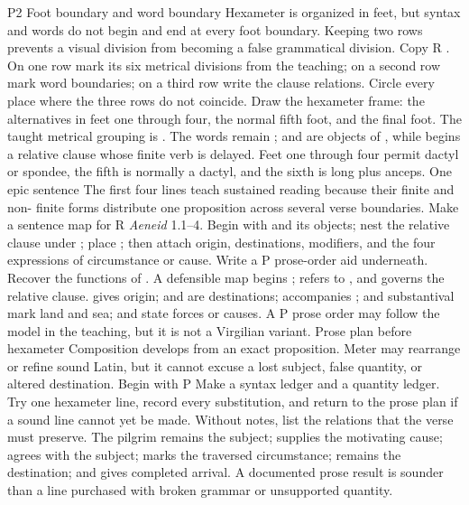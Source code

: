 \begin{courseunit}{P2}
\SubmoduleExtension
  {Foot boundary and word boundary}
  {Hexameter is organized in feet, but syntax and words do not begin and end
  at every foot boundary. Keeping two rows prevents a visual division from
  becoming a false grammatical division.}
  {Copy R . On one row
  mark its six metrical divisions from the teaching; on a second row mark word
  boundaries; on a third row write the clause relations. Circle every place
  where the three rows do not coincide.}
  {Draw the hexameter frame: the alternatives in feet one through four, the
  normal fifth foot, and the final foot.}
  {The taught metrical grouping is . The words remain ;  and  are
  objects of , while  begins a relative clause whose
  finite verb is delayed. Feet one through four permit dactyl or spondee, the
  fifth is normally a dactyl, and the sixth is long plus anceps.}
\SubmoduleExtension
  {One epic sentence}
  {The first four lines teach sustained reading because their finite and non-
  finite forms distribute one proposition across several verse boundaries.}
  {Make a sentence map for R \textit{Aeneid} 1.1--4. Begin with 
  and its objects; nest the relative clause under ; place
  ; then attach origin, destinations, modifiers, and the four
  expressions of circumstance or cause. Write a P prose-order aid underneath.}
  {Recover the functions of .}
  {A defensible map begins ;  refers to
  , and  governs the relative clause.  gives origin;  and  are
  destinations;  accompanies ;  and
  substantival  mark land and sea;  and
   state forces or causes. A P prose order may follow the model
  in the teaching, but it is not a Virgilian variant.}
\SubmoduleExtension
  {Prose plan before hexameter}
  {Composition develops from an exact proposition. Meter may rearrange or
  refine sound Latin, but it cannot excuse a lost subject, false quantity, or
  altered destination.}
  {Begin with P  Make a syntax ledger and a quantity ledger. Try one
  hexameter line, record every substitution, and return to the prose plan if a
  sound line cannot yet be made.}
  {Without notes, list the relations that the verse must preserve.}
  {The pilgrim remains the subject;  supplies the motivating cause;
   agrees with the subject;  marks the
  traversed circumstance;  remains the destination;
  and  gives completed arrival. A documented prose result is
  sounder than a line purchased with broken grammar or unsupported quantity.}
\end{courseunit}

